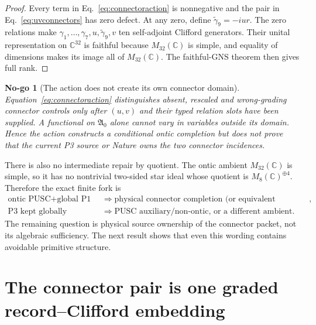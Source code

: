 \documentclass[11pt,a4paper]{article}
\newtheorem{nogo}[definition]{No-go}
\theoremstyle{remark}
\begin{document}
\begin{proof}
Every term in Eq.~\eqref{eq:connectoraction} is nonnegative and the pair in
Eq.~\eqref{eq:uvconnectors} has zero defect.  At any zero, define
$\widetilde\gamma_9=-iur$.  The zero relations make
$\gamma_1,\ldots,\gamma_7,u,\widetilde\gamma_9,v$ ten self-adjoint Clifford
generators.  Their unital representation on $\mathbb C^{32}$ is faithful
because $M_{32}(\mathbb C)$ is simple, and equality of dimensions makes its
image all of $M_{32}(\mathbb C)$.  The faithful-GNS theorem then gives full
rank.
\end{proof}

\begin{nogo}[The action does not create its own connector domain]
Equation~\eqref{eq:connectoraction} distinguishes absent, rescaled and
wrong-grading connector controls only after $(u,v)$ and their typed relation
slots have been supplied.  A functional on $\mathfrak A_0$ alone cannot vary
in variables outside its domain.  Hence the action constructs a conditional
ontic completion but does not prove that the current P3 source or Nature owns
the two connector incidences.
\end{nogo}

There is also no intermediate repair by quotient.  The ontic ambient
$M_{32}(\mathbb C)$ is simple, so it has no nontrivial two-sided star ideal
whose quotient is $M_8(\mathbb C)^{\oplus4}$.  Therefore the exact finite fork
is
\begin{equation}
 \boxed{\begin{aligned}
 \text{ontic PUSC}+\text{global P1}
 &\Longrightarrow \text{physical connector completion (or equivalent incidence)},\\
 \text{P3 kept globally complete}
 &\Longrightarrow \text{PUSC auxiliary/non-ontic, or a different ambient}.
 \end{aligned}}
 \label{eq:connectorfork}
\end{equation}
The remaining question is physical source ownership of the connector packet,
not its algebraic sufficiency.  The next result shows that even this wording
contains avoidable primitive structure.

\section{The connector pair is one graded record--Clifford embedding}
\end{document}
